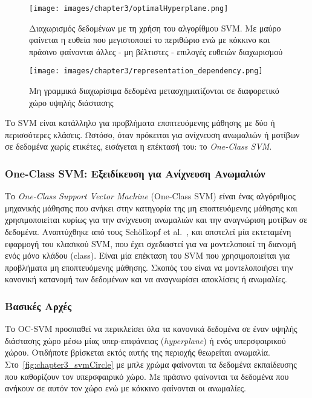 \begin{figure}[H]
    \centering
    \texttt{[image: images/chapter3/optimalHyperplane.png]}
    \caption{Διαχωρισμός δεδομένων με τη χρήση του αλγορίθμου SVM. Με μαύρο φαίνεται η ευθεία που μεγιστοποιεί το περιθώριο ενώ με κόκκινο και πράσινο φαίνονται άλλες - μη βέλτιστες - επιλογές ευθειών διαχωρισμού}
    \label{fig:chapter3_optimalHyperplane}
\end{figure}

\begin{figure}[H]
    \centering
    \texttt{[image: images/chapter3/representation\_dependency.png]}
    \caption{Μη γραμμικά διαχωρίσιμα δεδομένα μετασχηματίζονται σε διαφορετικό χώρο υψηλής διάστασης}
    \label{fig:chapter3_representation}
\end{figure}

Το SVM είναι κατάλληλο για προβλήματα εποπτευόμενης μάθησης με δύο ή περισσότερες κλάσεις. Ωστόσο, όταν πρόκειται για ανίχνευση ανωμαλιών ή μοτίβων σε δεδομένα χωρίς ετικέτες, εισάγεται η επέκτασή του: το \textit{One-Class SVM}.

\subsubsection{One-Class SVM: Εξειδίκευση για Ανίχνευση Ανωμαλιών}
Το \textit{One-Class Support Vector Machine} (One-Class SVM) είναι ένας αλγόριθμος μηχανικής μάθησης που ανήκει στην κατηγορία της μη εποπτευόμενης μάθησης και χρησιμοποιείται κυρίως για την ανίχνευση ανωμαλιών και την αναγνώριση μοτίβων σε δεδομένα. Αναπτύχθηκε από τους Schölkopf et al.~\cite{scholkopf2001ocsvm}, και αποτελεί μία εκτεταμένη εφαρμογή του κλασικού SVM, που έχει σχεδιαστεί για να μοντελοποιεί τη διανομή ενός μόνο κλάδου (class). Είναι μία επέκταση του SVM που χρησιμοποιείται για προβλήματα μη εποπτευόμενης μάθησης. Σκοπός του είναι να μοντελοποιήσει την κανονική κατανομή των δεδομένων και να αναγνωρίσει αποκλίσεις ή ανωμαλίες. 

\subsubsection{Βασικές Αρχές}
Το OC-SVM προσπαθεί να περικλείσει όλα τα κανονικά δεδομένα σε έναν υψηλής διάστασης χώρο μέσω μίας υπερ-επιφάνειας (\textit{hyperplane}) ή ενός υπερσφαιρικού χώρου. Οτιδήποτε βρίσκεται εκτός αυτής της περιοχής θεωρείται ανωμαλία. Στο~\autoref{fig:chapter3_svmCircle} με μπλε χρώμα φαίνονται τα δεδομένα εκπαίδευσης που καθορίζουν τον υπερσφαιρικό χώρο. Με πράσινο φαίνονται τα δεδομένα που ανήκουν σε αυτόν τον χώρο ενώ με κόκκινο φαίνονται οι ανωμαλίες.

